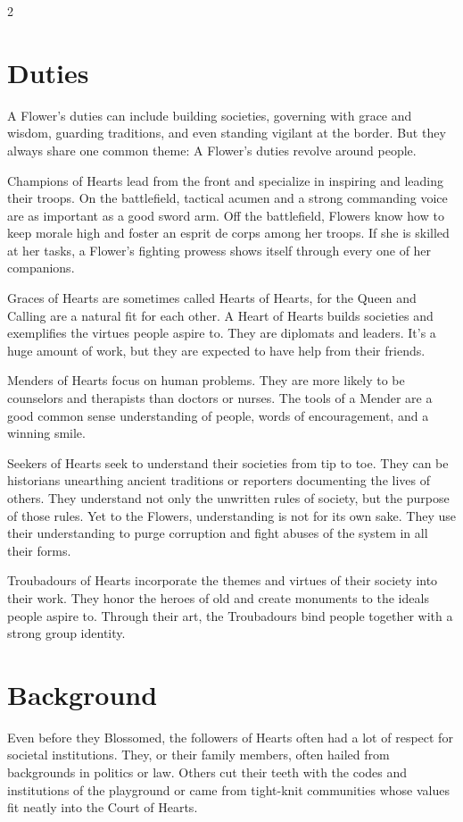 \begin{multicols}{2}
\section*{Duties}

A Flower's duties can include building societies, governing with grace and wisdom, guarding traditions, and even standing vigilant at the border. But they always share one common theme: A Flower's duties revolve around people. 

Champions of Hearts lead from the front and specialize in inspiring and leading their troops. On the battlefield, tactical acumen and a strong commanding voice are as important as a good sword arm. Off the battlefield, Flowers know how to keep morale high and foster an esprit de corps among her troops. If she is skilled at her tasks, a Flower's fighting prowess shows itself through every one of her companions. 

Graces of Hearts are sometimes called Hearts of Hearts, for the Queen and Calling are a natural fit for each other. A Heart of Hearts builds societies and exemplifies the virtues people aspire to. They are diplomats and leaders. It's a huge amount of work, but they are expected to have help from their friends. 

Menders of Hearts focus on human problems. They are more likely to be counselors and therapists than doctors or nurses. The tools of a Mender are a good common sense understanding of people, words of encouragement, and a winning smile. 

Seekers of Hearts seek to understand their societies from tip to toe. They can be historians unearthing ancient traditions or reporters documenting the lives of others. They understand not only the unwritten rules of society, but the purpose of those rules. Yet to the Flowers, understanding is not for its own sake. They use their understanding to purge corruption and fight abuses of the system in all their forms. 

Troubadours of Hearts incorporate the themes and virtues of their society into their work. They honor the heroes of old and create monuments to the ideals people aspire to. Through their art, the Troubadours bind people together with a strong group identity. 

\section*{Background}

Even before they Blossomed, the followers of Hearts often had a lot of respect for societal institutions. They, or their family members, often hailed from backgrounds in politics or law. Others cut their teeth with the codes and institutions of the playground or came from tight-knit communities whose values fit neatly into the Court of Hearts. 


\end{multicols}

